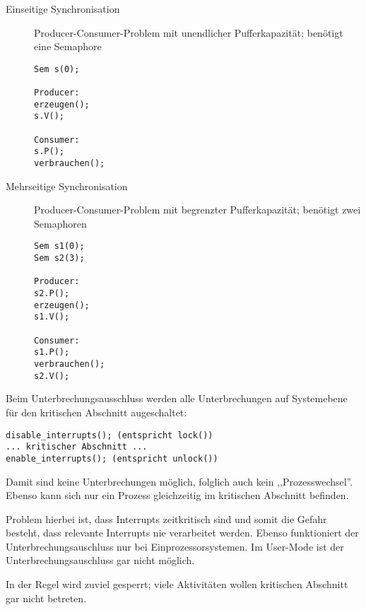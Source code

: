 \begin{answer}
\begin{description}

\item[Einseitige Synchronisation] Producer-Consumer-Problem mit unendlicher Pufferkapazität; benötigt eine Semaphore
\begin{verbatim}
Sem s(0);

Producer:
erzeugen();
s.V();

Consumer:
s.P();
verbrauchen();
\end{verbatim}

\item[Mehrseitige Synchronisation] Producer-Consumer-Problem mit begrenzter Pufferkapazität; benötigt zwei Semaphoren
\label{mehrseitige-synchronisation-beispiel}

\begin{verbatim}
Sem s1(0);
Sem s2(3);

Producer:
s2.P();
erzeugen();
s1.V();

Consumer:
s1.P();
verbrauchen();
s2.V();
\end{verbatim}
\end{description}
\end{answer}

\begin{answer}
Beim Unterbrechungsausschluss werden alle Unterbrechungen auf Systemebene für den kritischen Abschnitt augeschaltet:

\begin{verbatim}
disable_interrupts(); (entspricht lock())
... kritischer Abschnitt ...
enable_interrupts(); (entspricht unlock())
\end{verbatim}

Damit sind keine Unterbrechungen möglich, folglich auch kein ,,Prozesswechsel''. Ebenso kann sich nur ein Prozess gleichzeitig im kritischen Abschnitt befinden.

Problem hierbei ist, dass Interrupts zeitkritisch sind und somit die Gefahr besteht, dass relevante Interrupts nie verarbeitet werden. Ebenso funktioniert der Unterbrechungsauschluss nur bei Einprozessorsystemen. Im User-Mode ist der Unterbrechungsauschluss gar nicht möglich.

In der Regel wird zuviel gesperrt; viele Aktivitäten wollen kritischen Abschnitt gar nicht betreten.
\end{answer}

